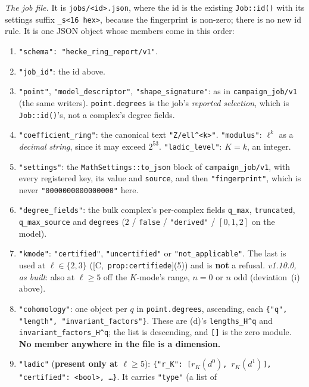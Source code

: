 \documentclass[11pt]{article}
\theoremstyle{remark}
\newcommand{\HA}[1]{[C,~\texttt{#1}]}      %
\begin{document}
\emph{The job file.} It is \texttt{jobs/<id>.json}, where the id is the existing
\texttt{Job::id()} with its settings suffix \texttt{\_s<16 hex>}, because the fingerprint is
non-zero; there is no new id rule. It is one JSON object whose members come in this order:
\begin{enumerate}[label=(g\arabic*)]
\item \texttt{"schema": "hecke\_ring\_report/v1"}.
\item \texttt{"job\_id"}: the id above.
\item \texttt{"point"}, \texttt{"model\_descriptor"}, \texttt{"shape\_signature"}: as in
  \texttt{campaign\_job/v1} (the same writers). \texttt{point.degrees} is the job's
  \emph{reported selection}, which is \texttt{Job::id()}'s, not a complex's degree fields.
\item \texttt{"coefficient\_ring"}: the canonical text \texttt{"Z/ell\textasciicircum<k>"}.
  \texttt{"modulus"}: $\ell^k$ as a \emph{decimal string}, since it may exceed $2^{53}$.
  \texttt{"ladic\_level"}: $K=k$, an integer.
\item \texttt{"settings"}: the \texttt{MathSettings::to\_json} block of
  \texttt{campaign\_job/v1}, with every registered key, its value and \texttt{source}, and then
  \texttt{"fingerprint"}, which is never \texttt{"0000000000000000"} here.
\item \texttt{"degree\_fields"}: the bulk complex's per-complex fields \texttt{q\_max},
  \texttt{truncated}, \texttt{q\_max\_source} and \texttt{degrees}
  ($2$ / \texttt{false} / \texttt{"derived"} / $[0,1,2]$ on the model).
\item \texttt{"kmode"}: \texttt{"certified"}, \texttt{"uncertified"} or
  \texttt{"not\_applicable"}. The last is used at $\ell\in\{2,3\}$
  (\HA{prop:certifiede}(5)) and is \textbf{not} a refusal. \emph{v1.10.0, as built}: also at
  $\ell\ge5$ off the $K$-mode's range, $n=0$ or $n$ odd (deviation~(i) above).
\item \texttt{"cohomology"}: one object per $q$ in \texttt{point.degrees}, ascending, each
  \texttt{\{"q", "length", "invariant\_factors"\}}. These are (d)'s
  \texttt{lengths\_H\textasciicircum q} and \texttt{invariant\_factors\_H\textasciicircum q}; the
  list is descending, and \texttt{[]} is the zero module. \textbf{No member anywhere in the file
  is a dimension.}
\item \texttt{"ladic"} (\textbf{present only at $\ell\ge5$}): \texttt{\{"r\_K": [$r_K(d^0)$,
  $r_K(d^1)$], "certified": <bool>, \ldots\}}. It carries \texttt{"type"} (a list of

\end{enumerate}
\end{document}
